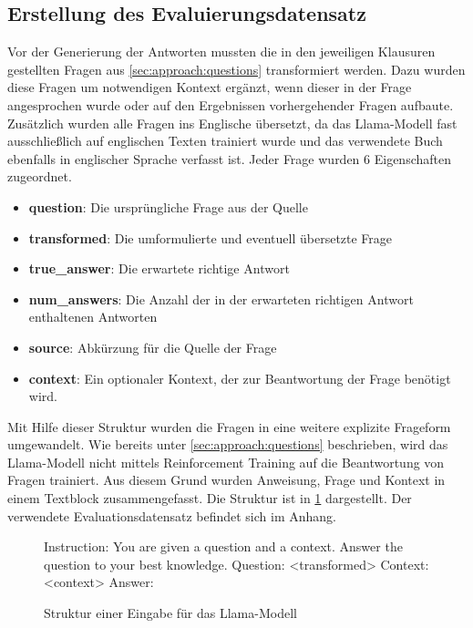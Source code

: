 \subsection{Erstellung des Evaluierungsdatensatz}\label{subsec:eval-dataset}
Vor der Generierung der Antworten mussten die in den jeweiligen Klausuren gestellten Fragen aus \cref{sec:approach:questions} transformiert werden.
Dazu wurden diese Fragen um notwendigen Kontext ergänzt, wenn dieser in der Frage angesprochen wurde oder auf den Ergebnissen vorhergehender Fragen aufbaute.
Zusätzlich wurden alle Fragen ins Englische übersetzt, da das Llama-Modell fast ausschließlich auf englischen Texten trainiert wurde und das verwendete Buch \citet{bb} ebenfalls in englischer Sprache verfasst ist.
Jeder Frage wurden 6 Eigenschaften zugeordnet.
\begin{itemize}
    \item \textbf{question}: Die ursprüngliche Frage aus der Quelle
    \item \textbf{transformed}: Die umformulierte und eventuell übersetzte Frage
    \item \textbf{true\_answer}: Die erwartete richtige Antwort
    \item \textbf{num\_answers}: Die Anzahl der in der erwarteten richtigen Antwort enthaltenen Antworten
    \item \textbf{source}: Abkürzung für die Quelle der Frage
    \item \textbf{context}: Ein optionaler Kontext, der zur Beantwortung der Frage benötigt wird.
\end{itemize}

Mit Hilfe dieser Struktur wurden die Fragen in eine weitere explizite Frageform umgewandelt.
Wie bereits unter \cref{sec:approach:questions} beschrieben, wird das Llama-Modell nicht mittels Reinforcement Training auf die Beantwortung von Fragen trainiert.
Aus diesem Grund wurden Anweisung, Frage und Kontext in einem Textblock zusammengefasst.
Die Struktur ist in \cref{fig:llama-input} dargestellt.
Der verwendete Evaluationsdatensatz befindet sich im Anhang.\\

\begin{figure}
    \begin{verbbox}
        Instruction: You are given a question and a context. Answer the question to your best knowledge.
        Question: <transformed>
        Context: <context>
        Answer:
    \end{verbbox}
    \resizebox{1.2\textwidth}{!}{\theverbbox}
    \caption{Struktur einer Eingabe für das Llama-Modell}\label{fig:llama-input}
\end{figure}

